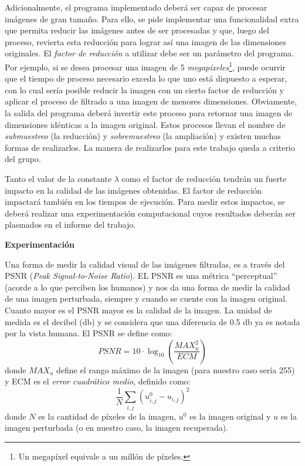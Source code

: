 \documentclass[a4paper]{article}
\begin{document}
Adicionalmente, el programa implementado deber\'a ser capaz de procesar im\'agenes de gran tama\~no. Para ello, se pide implementar una funcionalidad extra que permita reducir las im\'agenes antes de ser procesadas y que, luego del proceso, revierta esta reducci\'on para lograr as\'i una imagen de las dimensiones originales. El {\em factor de reducci\'on} a utilizar debe ser un par\'ametro del programa. Por ejemplo, si se desea procesar una imagen de 5 {\em megap\'ixeles}\footnote{Un megap\'ixel equivale a un mill\'on de p\'ixeles.}, puede ocurrir que el tiempo de proceso necesario exceda lo que uno est\'a dispuesto a esperar, con lo cual ser\'ia posible reducir la imagen con un cierto factor de reducci\'on y aplicar el proceso de filtrado a una imagen de menores dimensiones. Obviamente, la salida del programa deber\'a invertir este proceso para retornar una imagen de dimensiones id\'enticas a la imagen original. Estos procesos llevan el nombre de {\em submuestreo} (la reducci\'on) y {\em sobremuestreo} (la ampliaci\'on) y existen muchas formas de realizarlos. La manera de realizarlos para este trabajo queda a criterio del grupo.


Tanto el valor de la constante $\lambda$ como el factor de reducci\'on
tendr\'an un fuerte impacto en la calidad de las im\'agenes obtenidas. 
El factor de reducci\'on impactar\'a
tambi\'en en los tiempos de ejecuci\'on. Para medir estos impactos, se deber\'a realizar una experimentaci\'on computacional cuyos resultados deber\'an ser plasmados en el informe del trabajo.

{\bf Experimentaci\'on}

Una forma de medir la calidad visual de las im\'agenes filtradas, es a trav\'es del PSNR ({\em Peak Signal-to-Noise Ratio}).
EL PSNR es una m\'etrica ``perceptual'' (acorde a lo que perciben los humanos) y nos da una forma de medir la calidad de una imagen perturbada, siempre y cuando se cuente con la imagen original. 
Cuanto mayor es el PSNR mayor es la calidad de la imagen. La unidad de medida es el decibel (db) y se considera que una diferencia de 0.5 db ya es notada por la vista humana. El PSNR se define como:
$$
\mathit{PSNR} = 10 \cdot \log_{10} \left( \frac{\mathit{MAX}^2_u}{\mathit{ECM}} \right)
$$
donde $MAX_u$ define el rango m\'aximo de la imagen (para nuestro caso ser\'ia 255) y ECM es el {\em error cuadr\'atico medio}, definido como:
$$
\frac{1}{N} \sum_{i,j}{(u^0_{i,j} - u_{i,j})^2} 
$$
donde $N$ es la cantidad de p\'ixeles de la imagen, $u^0$ es la imagen original y $u$ es la imagen perturbada (o en nuestro caso, la imagen recuperada).
\end{document}
